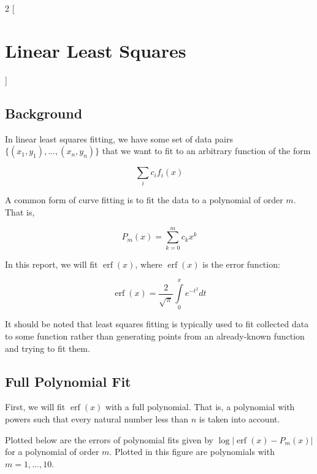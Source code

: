 \documentclass[10pt,a4paper]{article}
\DeclareMathOperator\erf{erf}
\begin{document}
\begin{multicols*}{2}
[
\section*{Linear Least Squares}
]

\subsection*{Background}

In linear least squares fitting, we have some set of data pairs $\{ (x_1, y_1), ... , (x_n, y_n)\}$ that we want to fit to an arbitrary function of the form

\begin{equation}
\sum\limits_i c_i f_i(x)
\label{eqn: arbitrary fit}
\end{equation}

A common form of curve fitting is to fit the data to a polynomial of order $m$. That is,

\begin{equation}
P_m(x) = \sum\limits_{k=0}^m c_k x^k
\label{eqn: general polynomial}
\end{equation}

In this report, we will fit $\erf{(x)}$, where $\erf{(x)}$ is the error function:

\begin{equation}
\erf{(x)} = \frac{2}{\sqrt{\pi}} \int\limits_0^x e^{-t^2} dt
\label{eqn: error function}
\end{equation}

It should be noted that least squares fitting is typically used to fit collected data to some function rather than generating points from an already-known function and trying to fit them.

\subsection*{Full Polynomial Fit}

First, we will fit $\erf{(x)}$ with a full polynomial. That is, a polynomial with powers such that every natural number less than $n$ is taken into account.

Plotted below are the errors of polynomial fits given by $\log \left| \erf{(x)} - P_m(x) \right|$ for a polynomial of order $m$. Plotted in this figure are polynomials with $m = 1, ..., 10$.


\end{multicols*}
\end{document}
